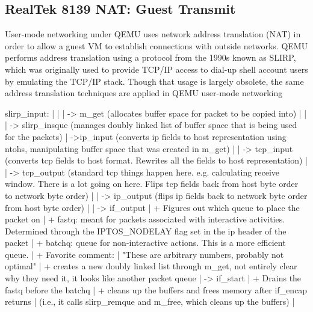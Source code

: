 \documentclass[11pt,pdftex,twocolumn]{article}
\begin{document}
\subsection{RealTek 8139 NAT: Guest Transmit}
User-mode networking under QEMU uses network address translation (NAT) in order to allow a guest VM to establish connections with outside networks. QEMU performs address translation using a protocol from the 1990s known as SLIRP, which was originally used to provide TCP/IP access to dial-up shell account users by emulating the TCP/IP stack. Though that usage is largely obsolete, the same address translation techniques are applied in QEMU user-mode networking 


slirp_input:
|          |
|           -> m_get (allocates buffer space for packet to be copied into)
|               |
|                -> slirp_insque (manages doubly linked list of buffer space that is being used for the packets)
|
 ->ip_input (converts ip fields to host representation using ntohs, manipulating buffer space that was created in m_get)
    |
    |
     -> tcp_input (converts tcp fields to host format. Rewrites all the fields to host representation)
         |
         |
          -> tcp_output (standard tcp things happen here. e.g. calculating receive window. There is a lot going on here. Flips tcp fields back from host byte order to network byte order)
              |
              |
               -> ip_output (flips ip fields back to network byte order from host byte order)
                   |
                   |
                    -> if_output 
                        |     + Figures out which queue to place the packet on
                        |         + fastq: meant for packets associated with interactive activities. Determined through the IPTOS_NODELAY flag set in the ip header of the packet
                        |         + batchq: queue for non-interactive actions. This is a more efficient queue.
                        |     + Favorite comment:
                        |           "These are arbitrary numbers, probably not optimal"
                        |     + creates a new doubly linked list through m_get, not entirely clear why they need it, it looks like another packet queue
                        |
                         -> if_start
                             |    + Drains the fastq before the batchq
                             |    + cleans up the buffers and frees memory after if_encap returns
                             |      (i.e., it calls slirp_remque and m_free, which cleans up the buffers)
                             |
\end{document}
